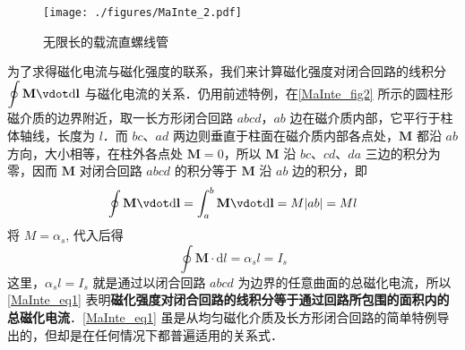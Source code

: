 \begin{figure}[ht]
\centering
\texttt{[image: ./figures/MaInte\_2.pdf]}
\caption{无限长的载流直螺线管} \label{MaInte_fig2}
\end{figure}
为了求得磁化电流与磁化强度的联系，我们来计算磁化强度对闭合回路的线积分 $\displaystyle \oint \mathbf M \vdot \mathrm{d} \mathbf l$ 与磁化电流的关系．仍用前述特例，在\autoref{MaInte_fig2} 所示的圆柱形磁介质的边界附近，取一长方形闭合回路 $abcd$，$ab $ 边在磁介质内部，它平行于柱体轴线，长度为 $l$．而 $bc$、$ad $ 两边则垂直于柱面在磁介质内部各点处，$\mathbf M$ 都沿 $ab $ 方向，大小相等，在柱外各点处 $\mathbf M=0$，所以 $\mathbf M $ 沿 $bc$、$cd$、$da $ 三边的积分为零，因而 $\mathbf M $ 对闭合回路 $abcd$ 的积分等于 $\mathbf M $ 沿 $ab $ 边的积分，即
\begin{equation}
\oint \mathbf{M}\vdot  \mathrm{d} \mathbf{l}=\int_{a}^{b} \mathbf{M} \vdot  \mathrm{d} \mathbf{l}=M|a b|=M l
\end{equation}
将 $M=\alpha_s$, 代入后得
\begin{equation} \label{MaInte_eq1}
\oint \mathbf M \cdot \mathrm{d} l=\alpha_{s} l=I_{s}
\end{equation}
这里，$\alpha_sl=I_s$ 就是通过以闭合回路 $abcd$ 为边界的任意曲面的总磁化电流，所以\autoref{MaInte_eq1} 表明\textbf{磁化强度对闭合回路的线积分等于通过回路所包围的面积内的总磁化电流}．\autoref{MaInte_eq1} 虽是从均匀磁化介质及长方形闭合回路的简单特例导出的，但却是在任何情况下都普遍适用的关系式．
